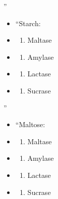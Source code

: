 \documentclass[
]{book}
\providecommand{\tightlist}{%
  \setlength{\itemsep}{0pt}\setlength{\parskip}{0pt}}
\begin{document}
''

\begin{itemize}
\item
  ``Starch:
\item
  \begin{enumerate}
  \def\labelenumi{(\Alph{enumi})}
  \tightlist
  \item
    Maltase\\
  \end{enumerate}
\item
  \begin{enumerate}
  \def\labelenumi{(\Alph{enumi})}
  \setcounter{enumi}{1}
  \tightlist
  \item
    Amylase\\
  \end{enumerate}
\item
  \begin{enumerate}
  \def\labelenumi{(\Alph{enumi})}
  \setcounter{enumi}{2}
  \tightlist
  \item
    Lactase\\
  \end{enumerate}
\item
  \begin{enumerate}
  \def\labelenumi{(\Alph{enumi})}
  \setcounter{enumi}{3}
  \tightlist
  \item
    Sucrase
  \end{enumerate}
\end{itemize}

''

\begin{itemize}
\item
  ``Maltose:
\item
  \begin{enumerate}
  \def\labelenumi{(\Alph{enumi})}
  \tightlist
  \item
    Maltase\\
  \end{enumerate}
\item
  \begin{enumerate}
  \def\labelenumi{(\Alph{enumi})}
  \setcounter{enumi}{1}
  \tightlist
  \item
    Amylase\\
  \end{enumerate}
\item
  \begin{enumerate}
  \def\labelenumi{(\Alph{enumi})}
  \setcounter{enumi}{2}
  \tightlist
  \item
    Lactase\\
  \end{enumerate}
\item
  \begin{enumerate}
  \def\labelenumi{(\Alph{enumi})}
  \setcounter{enumi}{3}
  \tightlist
  \item
    Sucrase
  \end{enumerate}
\end{itemize}
\end{document}
